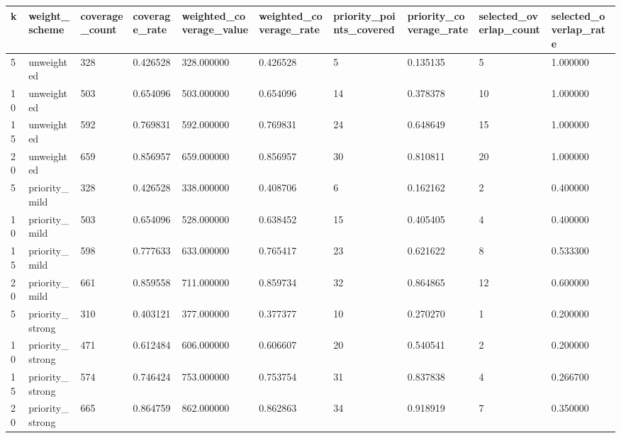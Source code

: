 \begin{tabular}{llllllllll}
\hline
k & weight_scheme & coverage_count & coverage_rate & weighted_coverage_value & weighted_coverage_rate & priority_points_covered & priority_coverage_rate & selected_overlap_count & selected_overlap_rate \\
\hline
5 & unweighted & 328 & 0.426528 & 328.000000 & 0.426528 & 5 & 0.135135 & 5 & 1.000000 \\
10 & unweighted & 503 & 0.654096 & 503.000000 & 0.654096 & 14 & 0.378378 & 10 & 1.000000 \\
15 & unweighted & 592 & 0.769831 & 592.000000 & 0.769831 & 24 & 0.648649 & 15 & 1.000000 \\
20 & unweighted & 659 & 0.856957 & 659.000000 & 0.856957 & 30 & 0.810811 & 20 & 1.000000 \\
5 & priority_mild & 328 & 0.426528 & 338.000000 & 0.408706 & 6 & 0.162162 & 2 & 0.400000 \\
10 & priority_mild & 503 & 0.654096 & 528.000000 & 0.638452 & 15 & 0.405405 & 4 & 0.400000 \\
15 & priority_mild & 598 & 0.777633 & 633.000000 & 0.765417 & 23 & 0.621622 & 8 & 0.533300 \\
20 & priority_mild & 661 & 0.859558 & 711.000000 & 0.859734 & 32 & 0.864865 & 12 & 0.600000 \\
5 & priority_strong & 310 & 0.403121 & 377.000000 & 0.377377 & 10 & 0.270270 & 1 & 0.200000 \\
10 & priority_strong & 471 & 0.612484 & 606.000000 & 0.606607 & 20 & 0.540541 & 2 & 0.200000 \\
15 & priority_strong & 574 & 0.746424 & 753.000000 & 0.753754 & 31 & 0.837838 & 4 & 0.266700 \\
20 & priority_strong & 665 & 0.864759 & 862.000000 & 0.862863 & 34 & 0.918919 & 7 & 0.350000 \\
\hline
\end{tabular}
